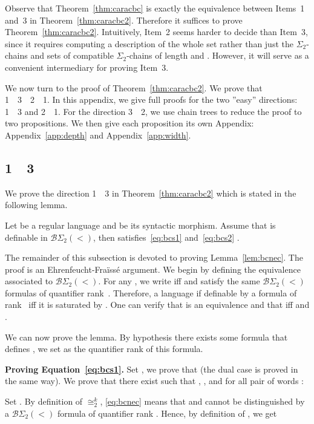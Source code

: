 \documentclass[envcountsame]{llncs}
\newcommand{\efgame}{Ehrenfeucht-Fra\"iss\'e\xspace}
\newcommand{\sic}[1]{\ensuremath{\Sigma_{#1}}\xspace}
\newcommand{\bswd}{\ensuremath{\mathcal{B}\Sigma_{2}(<)}\xspace}
\newcommand\bceq[2]{\ensuremath{\cong^{#1}_{#2}}\xspace}
\newcommand\kbceq[1]{\bceq{k}{#1}}
\newcommand\chain{chain\xspace}
\newcommand\qchains[1]{\ensuremath{\sic{#1}}-chains\xspace}
\newcommand\dchains{\qchains{2}}
\begin{document}
Observe that Theorem~\ref{thm:caracbc} is exactly the equivalence
between Items~1 and~3 in Theorem~\ref{thm:caracbc2}. Therefore it
suffices to prove Theorem~\ref{thm:caracbc2}. Intuitively, Item~2
seems harder to decide than Item~3, since it requires computing a
description of the whole set  rather than just the
\dchains and sets of compatible \dchains of length  and
. However, it will serve as a convenient intermediary for proving
Item~3.

We now turn to the proof of Theorem~\ref{thm:caracbc2}. We prove that
1~~3~~2~~1. In this appendix,
we give full proofs for the two ''easy'' directions: 1~~3 
and 2~~1. For the direction 3~~2, we use
\chain trees to reduce the proof to two propositions. We then give
each proposition its own Appendix: Appendix~\ref{app:depth} and
Appendix~\ref{app:width}.

\subsection{1~~3}
\label{sec:1-rightarrow-3-1}

We prove the direction 1~~3 in Theorem~\ref{thm:caracbc2}
which is stated in the following lemma.

\begin{lemma} \label{lem:bcnec}
  Let  be a regular language and  be its syntactic
  morphism. Assume that  is definable in \bswd, then 
  satisfies~\eqref{eq:bcs1} and~\eqref{eq:bcs2} .
\end{lemma}

The remainder of this subsection is devoted to proving
Lemma~\ref{lem:bcnec}. The proof is an \efgame argument. We begin by
defining the equivalence associated to \bswd. For any , we
write  iff  and  satisfy the same \bswd
formulas of quantifier rank~. Therefore, a language if definable by
a  formula of rank~ iff it is saturated by . One
can verify that  is an equivalence and that  iff  and .

We can now prove the lemma. By hypothesis there exists some 
formula  that defines , we set  as the quantifier rank  
of this formula. 

\medskip
\noindent
{\bf Proving Equation~\eqref{eq:bcs1}.} Set , we prove that  (the dual case is proved in the same
way). We prove that there exist  such that
, ,  and for all
pair of words : 

Set . By definition of \kbceq{2}, \eqref{eq:bcnec} means that  and
 cannot be distinguished by a \bswd
formula of quantifier rank . Hence, by definition of , we get
\end{document}
